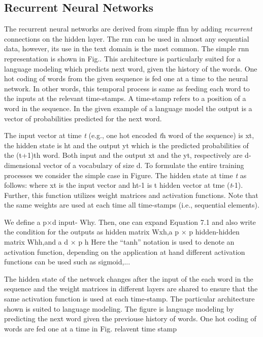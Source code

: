 \subsection{Recurrent Neural Networks}
The recurrent neural networks are derived from  simple ffnn by adding \textit{recurrent} connections on the hidden layer. The rnn can be used in almost any sequential data, however, its use in the text domain is the most common.  
The simple rnn representation is shown in Fig.. This architecture is particularly suited for a language modeling which predicts next word, given the history of the words. One hot coding of words from the given sequence is fed one at a time to the neural network. In other words, this temporal process is same as feeding each word to the inputs at the relevant time-stamps. A time-stamp refers to a position of a word in the sequence. In the given example of a language model the output is a vector of probabilities predicted for the next word. %

The input vector at time \textit{t} (e.g., one hot encoded \textit{t}h word of the sequence) is xt, the hidden state is ht and the output yt which is the predicted probabilities of the (t+1)th word. Both input and the output xt and the yt, respectively are d-dimensional vector of a vocabulary of size d. To formulate the entire training processes we consider the simple case in Figure. The hidden state at time \textit{t} as follows:
where xt is the input vector and ht-1 is t hidden vector at tme (\textit{t}-1). Further, this function utilizes weight matrices and activation functions. Note that the same weights are used at each time all time-stamps (i.e., sequential elements). 

We define a p×d input-
Why. Then, one can expand Equation 7.1 and also write the condition for the outputs as hidden matrix Wxh,a p × p hidden-hidden matrix Whh,and a d × p h
 Here the “tanh” notation is used to denote an activation function, depending on the application at hand different activation functions can be used such as sigmoid,...

The hidden state of the network changes after the input of the each word in the sequence and the weight matrices in different layers are shared to ensure that the same activation function is used at each time-stamp. The particular architecture shown is suited to language modeling. The figure is  language modeling by predicting the next word given the previouse history of words. One hot coding of words are fed one at a time in Fig. relavent time stamp
 

